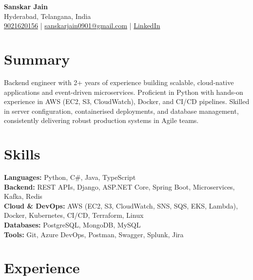 \documentclass[a4paper,10pt]{article}
\begin{document}
\begin{center}
    {\LARGE \textbf{Sanskar Jain}} \\
    Hyderabad, Telangana, India \\
    \href{tel:9021620156}{9021620156} \;|\;
    \href{mailto:sanskarjain0901@gmail.com}{sanskarjain0901@gmail.com} \;|\;
    \href{https://www.linkedin.com/in/sanskar-jain0901/}{LinkedIn}
\end{center}

\vspace{3pt}

\section*{Summary}
Backend engineer with 2+ years of experience building scalable, cloud-native applications and event-driven microservices.
Proficient in Python with hands-on experience in AWS (EC2, S3, CloudWatch), Docker, and CI/CD pipelines.
Skilled in server configuration, containerised deployments, and database management, consistently delivering robust production systems in Agile teams.

\section*{Skills}
\textbf{Languages:} Python, C\#, Java, TypeScript \\
\textbf{Backend:} REST APIs, Django, ASP.NET Core, Spring Boot, Microservices, Kafka, Redis \\
\textbf{Cloud \& DevOps:} AWS (EC2, S3, CloudWatch, SNS, SQS, EKS, Lambda), Docker, Kubernetes, CI/CD, Terraform, Linux \\
\textbf{Databases:} PostgreSQL, MongoDB, MySQL \\
\textbf{Tools:} Git, Azure DevOps, Postman, Swagger, Splunk, Jira

\section*{Experience}
\end{document}
